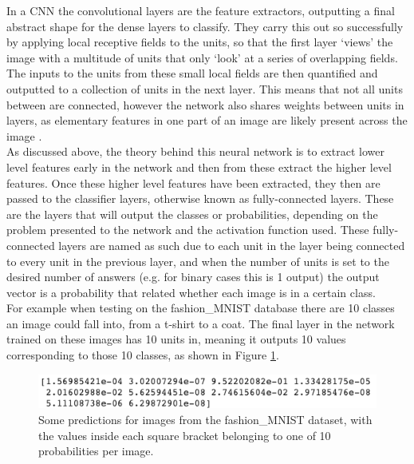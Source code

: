 \documentclass[12pt, onecolumn]{aa}
\begin{document}
In a CNN the convolutional layers are the feature extractors, outputting a final abstract shape for the dense layers to classify. They carry this out so successfully by applying local receptive fields to the units, so that the first layer ‘views’ the image with a multitude of units that only ‘look’ at a series of overlapping fields. The inputs to the units from these small local fields are then quantified and outputted to a collection of units in the next layer. This means that not all units between are connected, however the network also shares weights between units in layers, as elementary features in one part of an image are likely present across the image \citep{Lecun1998}. \\

As discussed above, the theory behind this neural network is to extract lower level features early in the network and then from these extract the higher level features. Once these higher level features have been extracted, they then are passed to the classifier layers, otherwise known as fully-connected layers. These are the layers that will output the classes or probabilities, depending on the problem presented to the network and the activation function used. These fully-connected layers are named as such due to each unit in the layer being connected to every unit in the previous layer, and when the number of units is set to the desired number of answers (e.g. for  binary cases this is 1 output) the output vector is a probability that related whether each image is in a certain class. \\

For example when testing on the fashion\_MNIST database there are 10 classes an image could fall into, from a t-shirt to a coat. The final layer in the network trained on these images has 10 units in, meaning it outputs 10 values corresponding to those 10 classes, as shown in Figure \ref{fig:fmnistpredict}.\\
\begin{figure}
    \centering
    \includegraphics[width=0.8\linewidth]{Figures/fashion_mnist_outputs.png}
    \caption{Some predictions for images from the fashion\_MNIST dataset, with the values inside each square bracket belonging to one of 10 probabilities per image.}
    \label{fig:fmnistpredict}
\end{figure}
\end{document}
